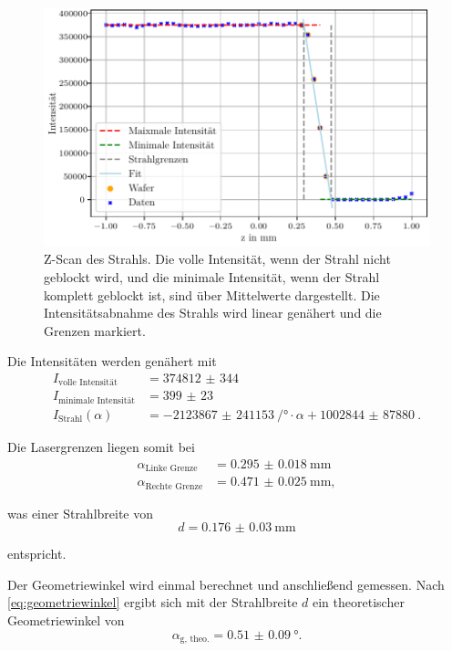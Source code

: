 \begin{figure}[H]
    \centering
    \includegraphics[width=\textwidth]{plots/zscan.pdf}
    \caption{Z-Scan des Strahls. Die volle Intensität, wenn der Strahl nicht geblockt wird, und die minimale Intensität, wenn der Strahl komplett geblockt ist, sind über Mittelwerte dargestellt.
    Die Intensitätsabnahme des Strahls wird linear genähert und die Grenzen markiert.}
    \label{fig:strahlbreite}
\end{figure}

Die Intensitäten werden genähert mit
\begin{align*}
    I_\text{volle Intensität} &= \qty{374812(344)}{} \\
    I_\text{minimale Intensität} &= \qty{399(23)}{} \\
    I_\text{Strahl}(\alpha) &= \qty{-2123867(241153)}{\per\degree} \cdot \alpha + \qty{1002844(87880)}{}.
\end{align*}

Die Lasergrenzen liegen somit bei
\begin{align*}
    \alpha_\text{Linke Grenze} &= \qty{0.295(18)}{\milli\meter} \\
    \alpha_\text{Rechte Grenze} &= \qty{0.471(25)}{\milli\meter},
\end{align*}

was einer Strahlbreite von 
\begin{equation*}
    d = \qty{0.176(30)}{\milli\meter}
\end{equation*}

entspricht. 

Der Geometriewinkel wird einmal berechnet und anschließend gemessen. Nach \autoref{eq:geometriewinkel}
ergibt sich mit der Strahlbreite $d$ ein theoretischer Geometriewinkel von
\begin{equation*}
    \alpha_\text{g, theo.} = \qty{0.51(9)}{\degree}.
\end{equation*}

